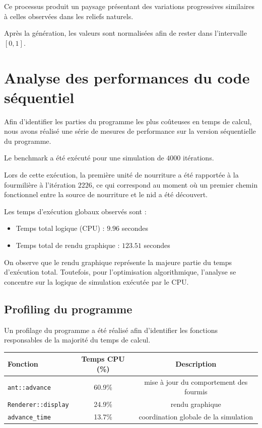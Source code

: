 \documentclass[11pt]{article}
\begin{document}
Ce processus produit un paysage présentant des variations progressives similaires à celles observées dans les reliefs naturels.

Après la génération, les valeurs sont normalisées afin de rester dans l'intervalle $[0,1]$.

\section{Analyse des performances du code séquentiel}

Afin d'identifier les parties du programme les plus coûteuses en temps de calcul, nous avons réalisé une série de mesures de performance sur la version séquentielle du programme.

Le benchmark a été exécuté pour une simulation de $4000$ itérations.

Lors de cette exécution, la première unité de nourriture a été rapportée à la fourmilière à l'itération $2226$, ce qui correspond au moment où un premier chemin fonctionnel entre la source de nourriture et le nid a été découvert.

Les temps d'exécution globaux observés sont :

\begin{itemize}

\item Temps total logique (CPU) : $9.96$ secondes
\item Temps total de rendu graphique : $123.51$ secondes
\end{itemize}

On observe que le rendu graphique représente la majeure partie du temps d'exécution total. Toutefois, pour l'optimisation algorithmique, l'analyse se concentre sur la logique de simulation exécutée par le CPU.

\subsection{Profiling du programme}

Un profilage du programme a été réalisé afin d'identifier les fonctions responsables de la majorité du temps de calcul.

\begin{center}

\begin{tabular}{lcc}
\toprule
Fonction & Temps CPU (\%) & Description \\
\midrule
\texttt{ant::advance} & 60.9\% & mise à jour du comportement des fourmis \\
\texttt{Renderer::display} & 24.9\% & rendu graphique \\
\texttt{advance\_time} & 13.7\% & coordination globale de la simulation \\
\bottomrule
\end{tabular}

\end{center}
\end{document}
